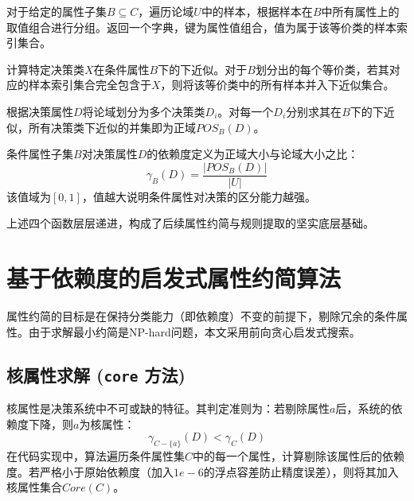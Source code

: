 \begin{definition}
	对于给定的属性子集\(B \subseteq C\)，遍历论域\(U\)中的样本，根据样本在\(B\)中所有属性上的取值组合进行分组。返回一个字典，键为属性值组合，值为属于该等价类的样本索引集合。
\end{definition}

\begin{definition}
	计算特定决策类\(X\)在条件属性\(B\)下的下近似。对于\(B\)划分出的每个等价类，若其对应的样本索引集合完全包含于\(X\)，则将该等价类中的所有样本并入下近似集合。
\end{definition}

\begin{definition}
	根据决策属性\(D\)将论域划分为多个决策类\(D_i\)。对每一个\(D_i\)分别求其在\(B\)下的下近似，所有决策类下近似的并集即为正域\(POS_B(D)\)。
\end{definition}

\begin{definition}
	条件属性子集\(B\)对决策属性\(D\)的依赖度定义为正域大小与论域大小之比：
	\begin{equation}
		\gamma_B(D) = \frac{|POS_B(D)|}{|U|}
	\end{equation}
	该值域为\([0, 1]\)，值越大说明条件属性对决策的区分能力越强。
\end{definition}

上述四个函数层层递进，构成了后续属性约简与规则提取的坚实底层基础。

\section{基于依赖度的启发式属性约简算法}

属性约简的目标是在保持分类能力（即依赖度）不变的前提下，剔除冗余的条件属性。由于求解最小约简是NP-hard问题，本文采用前向贪心启发式搜索。

\subsection{核属性求解 (\texttt{core} 方法)}

核属性是决策系统中不可或缺的特征。其判定准则为：若剔除属性\(a\)后，系统的依赖度下降，则\(a\)为核属性：
\begin{equation}
	\gamma_{C-\{a\}}(D) < \gamma_{C}(D)
\end{equation}
在代码实现中，算法遍历条件属性集\(C\)中的每一个属性，计算剔除该属性后的依赖度。若严格小于原始依赖度（加入\(1e-6\)的浮点容差防止精度误差），则将其加入核属性集合\(Core(C)\)。

